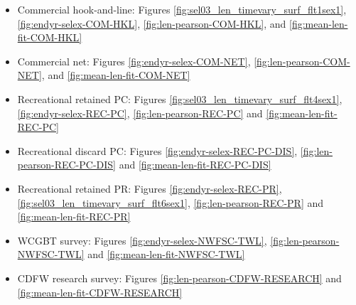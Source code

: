 \documentclass[11pt,
  english,
]{article}
\begin{document}
\begin{itemize}
\item

  Commercial hook-and-line: Figures \ref{fig:sel03_len_timevary_surf_flt1sex1}, \ref{fig:endyr-selex-COM-HKL}, \ref{fig:len-pearson-COM-HKL}, and \ref{fig:mean-len-fit-COM-HKL}

  \tagmcend\tagstructend\tagstructend
\item

  Commercial net: Figures \ref{fig:endyr-selex-COM-NET}, \ref{fig:len-pearson-COM-NET}, and \ref{fig:mean-len-fit-COM-NET}

  \tagmcend\tagstructend\tagstructend
\item

  Recreational retained PC: Figures \ref{fig:sel03_len_timevary_surf_flt4sex1}, \ref{fig:endyr-selex-REC-PC}, \ref{fig:len-pearson-REC-PC} and \ref{fig:mean-len-fit-REC-PC}

  \tagmcend\tagstructend\tagstructend
\item

  Recreational discard PC: Figures \ref{fig:endyr-selex-REC-PC-DIS}, \ref{fig:len-pearson-REC-PC-DIS} and \ref{fig:mean-len-fit-REC-PC-DIS}

  \tagmcend\tagstructend\tagstructend
\item

  Recreational retained PR: Figures \ref{fig:endyr-selex-REC-PR}, \ref{fig:sel03_len_timevary_surf_flt6sex1}, \ref{fig:len-pearson-REC-PR} and \ref{fig:mean-len-fit-REC-PR}

  \tagmcend\tagstructend\tagstructend
\item

  WCGBT survey: Figures \ref{fig:endyr-selex-NWFSC-TWL}, \ref{fig:len-pearson-NWFSC-TWL} and \ref{fig:mean-len-fit-NWFSC-TWL}

  \tagmcend\tagstructend\tagstructend
\item

  CDFW research survey: Figures \ref{fig:len-pearson-CDFW-RESEARCH} and \ref{fig:mean-len-fit-CDFW-RESEARCH}


\end{itemize}
\end{document}
